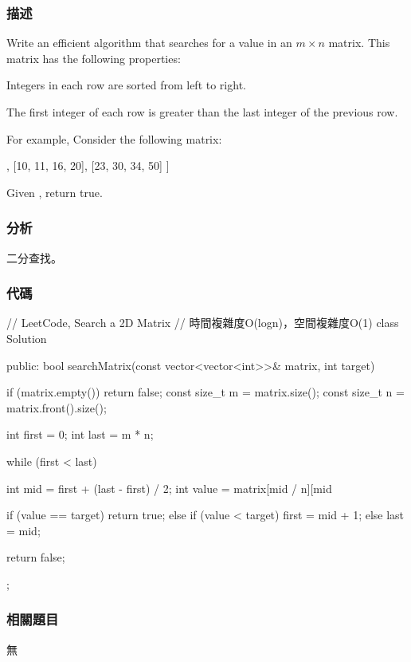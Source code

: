 \subsubsection{描述}
Write an efficient algorithm that searches for a value in an $m \times n$ matrix. This matrix has the following properties:
\begindot
\item Integers in each row are sorted from left to right.
\item The first integer of each row is greater than the last integer of the previous row.
\myenddot

For example, Consider the following matrix:
\begin{Code}
[
  [1,   3,  5,  7],
  [10, 11, 16, 20],
  [23, 30, 34, 50]
]
\end{Code}
Given , return true.


\subsubsection{分析}
二分查找。


\subsubsection{代碼}
\begin{Code}
// LeetCode, Search a 2D Matrix
// 時間複雜度O(logn)，空間複雜度O(1)
class Solution {
public:
    bool searchMatrix(const vector<vector<int>>& matrix, int target) {
        if (matrix.empty()) return false;
        const size_t  m = matrix.size();
        const size_t n = matrix.front().size();

        int first = 0;
        int last = m * n;

        while (first < last) {
            int mid = first + (last - first) / 2;
            int value = matrix[mid / n][mid %

            if (value == target)
                return true;
            else if (value < target)
                first = mid + 1;
            else
                last = mid;
        }

        return false;
    }
};
\end{Code}


\subsubsection{相關題目}
\begindot
\item 無
\myenddot
